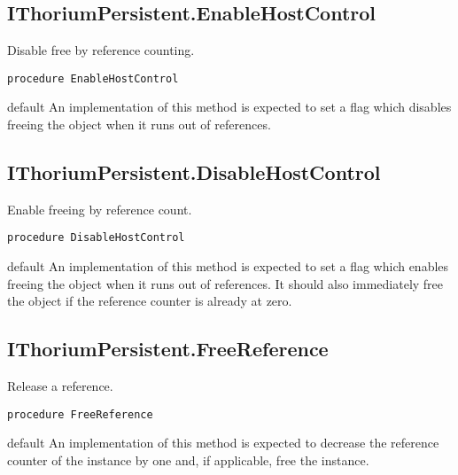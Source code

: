 \subsection{IThoriumPersistent.EnableHostControl}
\label{thoriumcorepkg:thorium:ithoriumpersistent:enablehostcontrol}
\begin{FPCList}
\Synopsis
Disable free by reference counting.\Declaration 

\begin{verbatim}
procedure EnableHostControl
\end{verbatim}
\Visibility
default
\Description
An implementation of this method is expected to set a flag which disables freeing the object when it runs out of references.\end{FPCList}
\subsection{IThoriumPersistent.DisableHostControl}
\label{thoriumcorepkg:thorium:ithoriumpersistent:disablehostcontrol}
\begin{FPCList}
\Synopsis
Enable freeing by reference count.\Declaration 

\begin{verbatim}
procedure DisableHostControl
\end{verbatim}
\Visibility
default
\Description
An implementation of this method is expected to set a flag which enables freeing the object when it runs out of references. It should also immediately free the object if the reference counter is already at zero.\end{FPCList}
\subsection{IThoriumPersistent.FreeReference}
\label{thoriumcorepkg:thorium:ithoriumpersistent:freereference}
\begin{FPCList}
\Synopsis
Release a reference.\Declaration 

\begin{verbatim}
procedure FreeReference
\end{verbatim}
\Visibility
default
\Description
An implementation of this method is expected to decrease the reference counter of the instance by one and, if applicable, free the instance.\end{FPCList}

